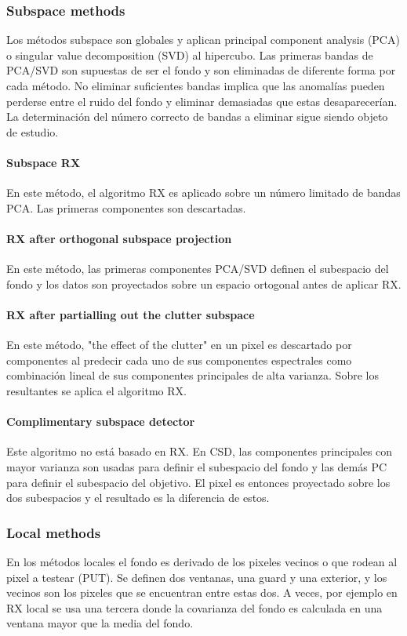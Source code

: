 \subsubsection{Subspace methods}
Los métodos subspace son globales y aplican principal component analysis (PCA) o singular value decomposition (SVD) al hipercubo. Las primeras bandas de PCA/SVD son supuestas de ser el fondo y son eliminadas de diferente forma por cada método. No eliminar suficientes bandas implica que las anomalías pueden perderse entre el ruido del fondo y eliminar demasiadas que estas desaparecerían. La determinación del número correcto de bandas a eliminar sigue siendo objeto de estudio. \cite{borghys_hyperspectral_2012}

\paragraph{Subspace RX}
En este método, el algoritmo RX es aplicado sobre un número limitado de bandas PCA. Las primeras componentes son descartadas.

\paragraph{RX after orthogonal subspace projection}
En este método, las primeras componentes PCA/SVD definen el subespacio del fondo y los datos son proyectados sobre un espacio ortogonal antes de aplicar RX.

\paragraph{RX after partialling out the clutter subspace}
En este método, "the effect of the clutter" en un pixel es descartado por componentes al predecir cada uno de sus componentes espectrales como combinación lineal de sus componentes principales de alta varianza. Sobre los resultantes se aplica el algoritmo RX.

\paragraph{Complimentary subspace detector}
Este algoritmo no está basado en RX. En CSD, las componentes principales con mayor varianza son usadas para definir el subespacio del fondo y las demás PC para definir el subespacio del objetivo. El pixel es entonces proyectado sobre los dos subespacios y el resultado es la diferencia de estos.

\subsubsection{Local methods}
En los métodos locales el fondo es derivado de los pixeles vecinos o que rodean al pixel a testear (PUT). Se definen dos ventanas, una guard y una exterior, y los vecinos son los pixeles que se encuentran entre estas dos. A veces, por ejemplo en RX local se usa una tercera donde la covarianza del fondo es calculada en una ventana mayor que la media del fondo.
